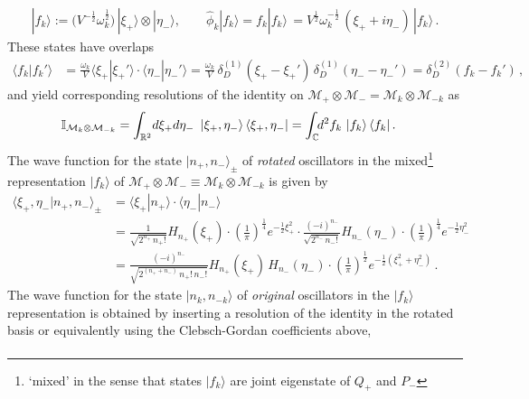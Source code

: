 \documentclass[../QFT_main.tex]{subfiles}
\begin{document}
\begin{mytheorem}
\begin{align}
    |f_k\rangle := \Big(V^{-\frac{1}{2}}\omega_k^{\frac{1}{2}}\Big)\, |\xi_+\rangle \otimes |\eta_-\rangle,\qquad
    \hat{\phi}_k |f_k\rangle =  f_k |f_k\rangle\, = V^{\frac{1}{2}} \omega_k^{-\frac{1}{2}}\, (\xi_+ + i \eta_-)\, |f_k\rangle\,.
\end{align}
%
These states have overlaps
\begin{align}
    \langle f_k | f_k' \rangle &= \frac{\omega_k}{V} \langle \xi_+ | \xi_+' \rangle \cdot \langle \eta_- | \eta_-' \rangle 
    = \frac{\omega_k}{V} \,\delta^{(1)}_D(\xi_+ - \xi_+') \, \delta^{(1)}_D(\eta_- - \eta_-')
    = \delta^{(2)}_D(f_k - f_k')\,,
\end{align}
and yield corresponding resolutions of the identity on $\mathcal{M}_+ \otimes \mathcal{M}_{-}= \mathcal{M}_k \otimes \mathcal{M}_{-k}$ as
\begin{align}
    \mathbb{I}_{\mathcal{M}_k \otimes \mathcal{M}_{-k}} 
    &= \int_{\mathbb{R}^2} \!d\xi_+ d\eta_-\,\,\, |\xi_+, \eta_- \rangle\,\langle \xi_+, \eta_- |
    = \int_{\mathbb{C}}\!\!d^2 f_k \,\, |f_k\rangle \, \langle f_k |\,.
\end{align}
%
The wave function for the state $|n_+,n_-\rangle_{\pm}$ of \emph{rotated} oscillators in the mixed\footnote{`mixed' in the sense that states $|f_k\rangle$ are joint eigenstate of $Q_+$ and $P_-$} representation $|f_k\rangle$ of $\mathcal{M}_{+}\otimes \mathcal{M}_{-}\equiv \mathcal{M}_{k}\otimes \mathcal{M}_{-k}$ is given by 
\begin{align}
    \langle \xi_+,\eta_-| n_+, n_- \rangle_{\pm} 
    &= \langle \xi_+ | n_+ \rangle \cdot \langle \eta_- | n_- \rangle
    \\
    &= \frac{1}{\sqrt{2^{n_+} \,n_+!}} H_{n_+}\!(\xi_+) \cdot \left( \tfrac{1}{\pi} \right)^{\frac{1}{4}} e^{-\frac{1}{2}\xi_{+}^2} \cdot \frac{(-i)^{n_-}}{\sqrt{2^{n_-} \,n_-!}} H_{n_-}\!(\eta_-) \cdot \left( \tfrac{1}{\pi} \right)^{\frac{1}{4}} e^{-\frac{1}{2}\eta_{-}^2}
    \\
    &= \frac{(-i)^{n_-}}{\sqrt{2^{(n_+ + n_-)} \,n_+!\, n_-!}} H_{n_+}\!(\xi_+)\, H_{n_-}\!(\eta_-) \cdot \left( \tfrac{1}{\pi} \right)^{\frac{1}{2}} e^{-\frac{1}{2}(\xi_{+}^2 + \eta_{-}^2)}\,.
\end{align}
%
The wave function for the state $|n_k, n_{-k}\rangle$ of \emph{original} oscillators in the $|f_k\rangle$ representation is obtained by inserting a resolution of the identity in the rotated basis or equivalently using the Clebsch-Gordan coefficients above,
{\small
\begin{align}

\end{align}}
\end{mytheorem}
\end{document}
